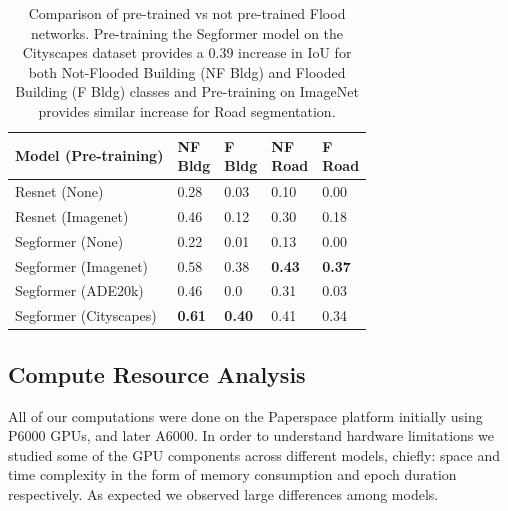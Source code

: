 \documentclass[10pt,twocolumn,letterpaper]{article}
\begin{document}
\begin{table}
    \begin{tabular}{lllll}
        Model (Pre-training) & \makecell{NF \\ Bldg} & \makecell{F \\ Bldg} & \makecell{NF \\ Road} & \makecell{F \\ Road} \\
        \hline
        Resnet (None) & 0.28 & 0.03 & 0.10 & 0.00 \\
        Resnet (Imagenet) & 0.46 & 0.12 & 0.30 & 0.18 \\
        Segformer (None) & 0.22 & 0.01 & 0.13 & 0.00 \\
        Segformer (Imagenet) & 0.58 & 0.38 & \textbf{0.43} & \textbf{0.37} \\
        Segformer (ADE20k) & 0.46 & 0.0 & 0.31 & 0.03 \\
        Segformer (Cityscapes) & \textbf{0.61} & \textbf{0.40} & 0.41 & 0.34 \\
    \end{tabular}
    \caption{Comparison of pre-trained vs not pre-trained Flood networks. Pre-training the Segformer model on the Cityscapes dataset provides a 0.39 increase in IoU for both Not-Flooded Building (NF Bldg) and Flooded Building (F Bldg) classes and Pre-training on ImageNet provides similar increase for Road segmentation.}
    \label{fig:pre-training-flood}
\end{table}

\subsection{Compute Resource Analysis}

All of our computations were done on the Paperspace platform initially using P6000 GPUs, and later A6000. In order to understand hardware limitations we studied some of the GPU components across different models, chiefly: space and time complexity in the form of memory consumption and epoch duration respectively. As expected we observed large differences among models. 
\end{document}
